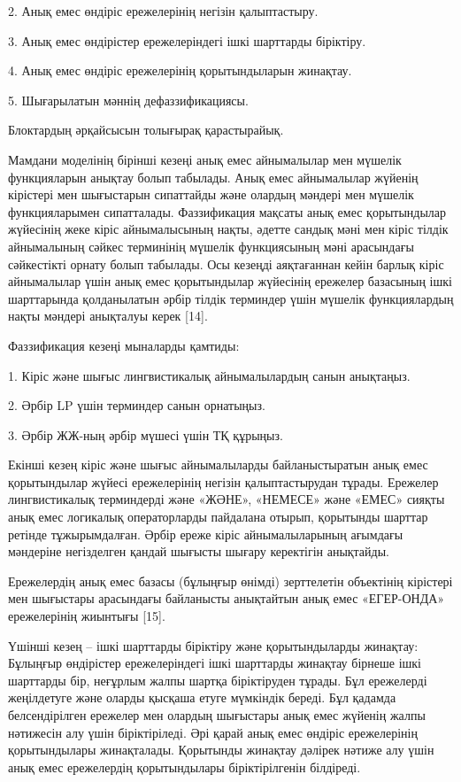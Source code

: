 2. Анық емес өндіріс ережелерінің негізін қалыптастыру.

3. Анық емес өндірістер ережелеріндегі ішкі шарттарды біріктіру.

4. Анық емес өндіріс ережелерінің қорытындыларын жинақтау.

5. Шығарылатын мәннің дефаззификациясы.

Блоктардың әрқайсысын толығырақ қарастырайық.

Мамдани моделінің бірінші кезеңі анық емес айнымалылар мен мүшелік
функцияларын анықтау болып табылады. Анық емес айнымалылар жүйенің
кірістері мен шығыстарын сипаттайды және олардың мәндері мен мүшелік
функцияларымен сипатталады. Фаззификация мақсаты анық емес қорытындылар
жүйесінің жеке кіріс айнымалысының нақты, әдетте сандық мәні мен кіріс
тілдік айнымалының сәйкес терминінің мүшелік функциясының мәні
арасындағы сәйкестікті орнату болып табылады. Осы кезеңді аяқтағаннан
кейін барлық кіріс айнымалылар үшін анық емес қорытындылар жүйесінің
ережелер базасының ішкі шарттарында қолданылатын әрбір тілдік терминдер
үшін мүшелік функциялардың нақты мәндері анықталуы керек {[}14{]}.

Фаззификация кезеңі мыналарды қамтиды:

1. Кіріс және шығыс лингвистикалық айнымалылардың санын анықтаңыз.

2. Әрбір LP үшін терминдер санын орнатыңыз.

3. Әрбір ЖЖ-ның әрбір мүшесі үшін ТҚ құрыңыз.

Екінші кезең кіріс және шығыс айнымалыларды байланыстыратын анық емес
қорытындылар жүйесі ережелерінің негізін қалыптастырудан тұрады.
Ережелер лингвистикалық терминдерді және «ЖӘНЕ», «НЕМЕСЕ» және «ЕМЕС»
сияқты анық емес логикалық операторларды пайдалана отырып, қорытынды
шарттар ретінде тұжырымдалған. Әрбір ереже кіріс айнымалыларының
ағымдағы мәндеріне негізделген қандай шығысты шығару керектігін
анықтайды.

Ережелердің анық емес базасы (бұлыңғыр өнімді) зерттелетін объектінің
кірістері мен шығыстары арасындағы байланысты анықтайтын анық емес
«ЕГЕР-ОНДА» ережелерінің жиынтығы {[}15{]}.

Үшінші кезең -- ішкі шарттарды біріктіру және қорытындыларды жинақтау:
Бұлыңғыр өндірістер ережелеріндегі ішкі шарттарды жинақтау бірнеше ішкі
шарттарды бір, неғұрлым жалпы шартқа біріктіруден тұрады. Бұл ережелерді
жеңілдетуге және оларды қысқаша етуге мүмкіндік береді. Бұл қадамда
белсендірілген ережелер мен олардың шығыстары анық емес жүйенің жалпы
нәтижесін алу үшін біріктіріледі. Әрі қарай анық емес өндіріс
ережелерінің қорытындылары жинақталады. Қорытынды жинақтау дәлірек
нәтиже алу үшін анық емес ережелердің қорытындылары біріктірілгенін
білдіреді.

